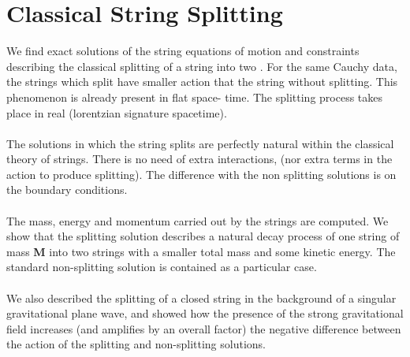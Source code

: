 \documentclass[12pt,a4paper]{article}
\begin{document}
\section{Classical String Splitting}
We find exact solutions of the string equations of motion and constraints 
describing the classical splitting of a string into two \cite{vmms}. For 
the same Cauchy data, the strings which split have smaller action that the 
string without splitting. This phenomenon is already present in flat space-
time. The splitting process takes place in real (lorentzian signature 
spacetime).\\ \\The solutions in which the string splits are perfectly natural 
within the classical theory of strings. There is no need of extra interactions, (nor extra terms in the action to produce splitting). The difference with the 
non splitting solutions is on the boundary conditions. \\ \\The mass, energy and momentum carried out by the strings are computed. We show that the splitting 
solution describes a natural decay process of one string of mass {\bf M} 
into two strings with a smaller total mass and some kinetic energy. The 
standard non-splitting solution is contained as a particular case. \\ \\We 
also described 
the splitting of a closed string in the background of a singular gravitational 
plane wave, and showed how the presence of the strong gravitational field 
increases (and amplifies by an overall factor) the negative difference between the action of the splitting and non-splitting solutions.
\end{document}
